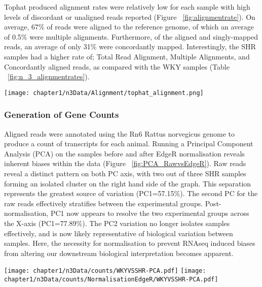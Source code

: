 Tophat produced alignment rates were relatively low for each sample with high levels of discordant or unaligned reads reported (Figure ~\ref{fig:alignmentrate}). On average, 67\% of reads were aligned to the reference genome, of which an average of 0.5\% were multiple alignments. Furthermore, of the aligned and singly-mapped reads, an average of only 31\% were concordantly mapped. Interestingly, the SHR samples had a higher rate of; Total Read Alignment, Multiple Alignments, and Concordantly aligned reads, as compared with the WKY samples (Table ~\ref{fig:n_3_alignmentrates}). \\  

\begin{figure*}[!hbtp]
\centering
\texttt{[image: chapter1/n3Data/Alignment/tophat\_alignment.png]}
\caption[Tophat Alignment rates for N=3 Dataset]{Plot of Tophat generated alignment rates (Millions of reads) for the n=3 dataset. Here, the total reads are split into; Aligned, Multimapped, Discordantly Mapped, and Not Aligned.}
\label{fig:alignmentrate}
\end{figure*}

\subsubsection{Generation of Gene Counts}

Aligned reads were annotated using the Rn6 Rattus norvegicus genome to produce a count of transcripts for each animal. Running a Principal Component Analysis (PCA) on the samples before and after EdgeR normalisation reveals inherent biases within the data (Figure ~\ref{fig:PCA_RawvsEdgeR}). Raw reads reveal a distinct pattern on both PC axis, with two out of three SHR samples forming an isolated cluster on the right hand side of the graph. This separation represents the greatest source of variation (PC1=57.15\%). The second PC for the raw reads effectively stratifies between the experimental groups. Post-normalisation, PC1 now appears to resolve the two experimental groups across the X-axis (PC1=77.89\%). The PC2 variation no longer isolates samples effectively, and is now likely representative of biological variation between samples. Here, the necessity for normalisation to prevent RNAseq induced biases from altering our downstream biological interpretation becomes apparent. 

\begin{figure*}[!hbtp]
\centering
\texttt{[image: chapter1/n3Data/counts/WKYVSSHR-PCA.pdf]}
\texttt{[image: chapter1/n3Data/counts/NormalisationEdgeR/WKYVSSHR-PCA.pdf]}
\caption[Principal Component Analysis - Raw vs EdgeR Normalised]{Principal Component Analysis (PCA) of n=3 counts. PCA was conducted on both raw (Top) and EdgeR normalised (Bottom) counts. Both PCA outputs reveal a clear separation between the strains.} 
\label{fig:PCA_RawvsEdgeR}
\end{figure*}

